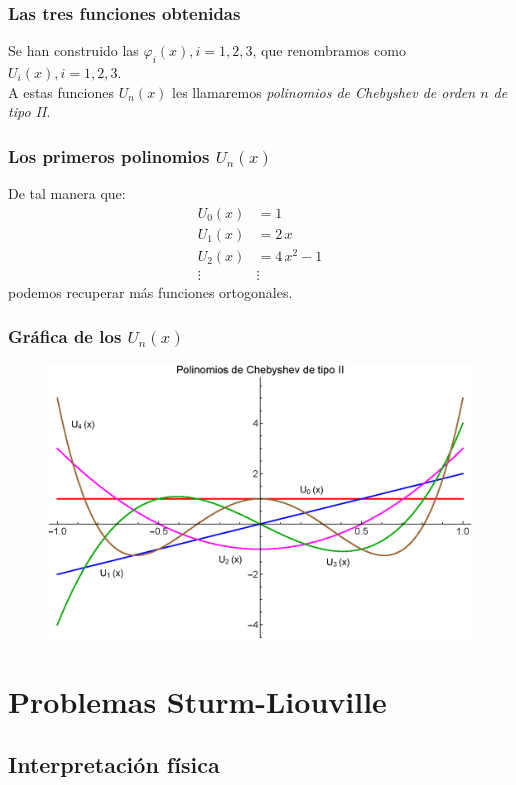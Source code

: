 \documentclass[12pt]{beamer}
\begin{document}
\begin{frame}
\frametitle{Las tres funciones obtenidas}
Se han construido las $\varphi_{i}(x), i = 1, 2, 3$, que renombramos como $U_{i}(x), i = 1, 2, 3$.
\\
\bigskip
\pause
A estas funciones $U_{n}(x)$ les llamaremos \emph{polinomios de Chebyshev de orden $n$ de tipo II}.
\end{frame}
\begin{frame}
\frametitle{Los primeros polinomios $U_{n}(x)$}
De tal manera que:
\pause
\begin{align*}
U_{0} (x) &= 1 \\[0.5em]
U_{1} (x) &= 2 \, x \\[0.5em]
U_{2} (x) &= 4 \, x^{2} - 1 \\[0.5em]
\vdots & \vdots
\end{align*}
podemos recuperar más funciones ortogonales.
\end{frame}
\begin{frame}
\frametitle{Gráfica de los $U_{n}(x)$}
\begin{figure}
    \centering
    \includegraphics[scale=0.62]{Imagenes/Gram_Schmidt_Chebyshev_2.eps}
\end{figure}
\end{frame}

\section{Problemas Sturm-Liouville}
\subsection{Interpretación física}
\end{document}
